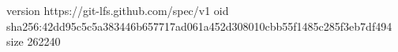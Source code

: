 version https://git-lfs.github.com/spec/v1
oid sha256:42dd95c5c5a383446b657717ad061a452d308010cbb55f1485c285f3eb7df494
size 262240

